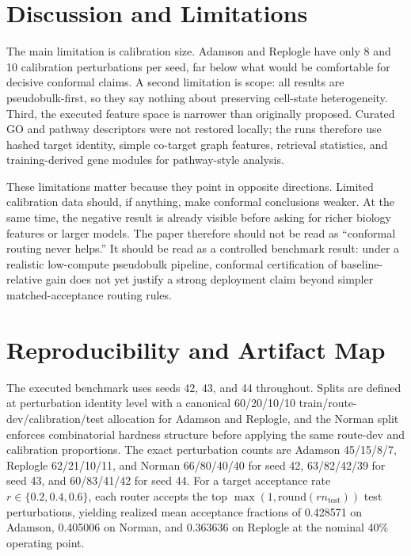 \documentclass{article}
\begin{document}
\section{Discussion and Limitations}
\label{sec:discussion}
The main limitation is calibration size. Adamson and Replogle have only 8 and 10 calibration perturbations per seed, far below what would be comfortable for decisive conformal claims. A second limitation is scope: all results are pseudobulk-first, so they say nothing about preserving cell-state heterogeneity. Third, the executed feature space is narrower than originally proposed. Curated GO and pathway descriptors were not restored locally; the runs therefore use hashed target identity, simple co-target graph features, retrieval statistics, and training-derived gene modules for pathway-style analysis.

These limitations matter because they point in opposite directions. Limited calibration data should, if anything, make conformal conclusions weaker. At the same time, the negative result is already visible before asking for richer biology features or larger models. The paper therefore should not be read as ``conformal routing never helps.'' It should be read as a controlled benchmark result: under a realistic low-compute pseudobulk pipeline, conformal certification of baseline-relative gain does not yet justify a strong deployment claim beyond simpler matched-acceptance routing rules.

\section{Reproducibility and Artifact Map}
\label{sec:repro}
The executed benchmark uses seeds 42, 43, and 44 throughout. Splits are defined at perturbation identity level with a canonical 60/20/10/10 train/route-dev/calibration/test allocation for Adamson and Replogle, and the Norman split enforces combinatorial hardness structure before applying the same route-dev and calibration proportions. The exact perturbation counts are Adamson 45/15/8/7, Replogle 62/21/10/11, and Norman 66/80/40/40 for seed 42, 63/82/42/39 for seed 43, and 60/83/41/42 for seed 44. For a target acceptance rate $r \in \{0.2,0.4,0.6\}$, each router accepts the top $\max(1,\mathrm{round}(r n_{\mathrm{test}}))$ test perturbations, yielding realized mean acceptance fractions of 0.428571 on Adamson, 0.405006 on Norman, and 0.363636 on Replogle at the nominal 40\% operating point.
\end{document}
